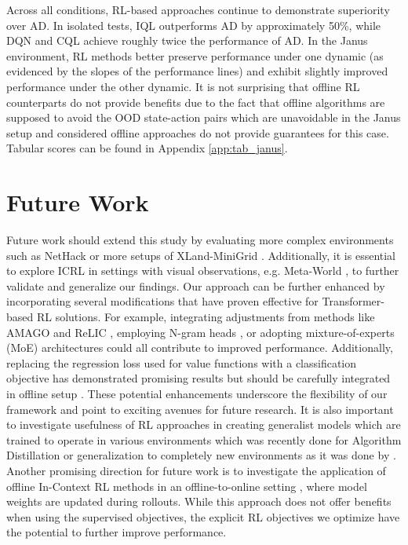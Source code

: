 \documentclass{article}
\begin{document}
Across all conditions, RL-based approaches continue to demonstrate superiority over AD. In isolated tests, IQL outperforms AD by approximately 50\%, while DQN and CQL achieve roughly twice the performance of AD. In the Janus environment, RL methods better preserve performance under one dynamic (as evidenced by the slopes of the performance lines) and exhibit slightly improved performance under the other dynamic. It is not surprising that offline RL counterparts do not provide benefits due to the fact that offline algorithms are supposed to avoid the OOD state-action pairs which are unavoidable in the Janus setup and considered offline approaches do not provide guarantees for this case. Tabular scores can be found in Appendix \ref{app:tab_janus}.
\section{Future Work}
\label{app:future}
Future work should extend this study by evaluating more complex environments such as NetHack \citep{kuttler2020nethack, kurenkov2024katakomba} or more setups of XLand-MiniGrid \citep{nikulin2023xland, nikulin2024xland}. Additionally, it is essential to explore ICRL in settings with visual observations, e.g. Meta-World \citep{yu2020meta}, to further validate and generalize our findings.
Our approach can be further enhanced by incorporating several modifications that have proven effective for Transformer-based RL solutions. For example, integrating adjustments from methods like AMAGO and ReLIC \citep{grigsby2023amago, elawady2024relic}, employing N-gram heads \citep{akyurek2024context, zisman2024n}, or adopting mixture-of-experts (MoE) architectures \citep{shazeer2017outrageously, obando2024mixtures} could all contribute to improved performance. Additionally, replacing the regression loss used for value functions with a classification objective has demonstrated promising results \citep{farebrother2024stop} but should be carefully integrated in offline setup \citep{tarasov2024value}. These potential enhancements underscore the flexibility of our framework and point to exciting avenues for future research.
It is also important to investigate usefulness of RL approaches in creating generalist models which are trained to operate in various environments which was recently done for Algorithm Distillation \citep{polubarov2025vintixactionmodelincontext} or generalization to completely new environments as it was done by \citet{raparthy2023generalization}.
Another promising direction for future work is to investigate the application of offline In-Context RL methods in an offline-to-online setting \citep{nair2020awac, lee2022offline}, where model weights are updated during rollouts. While this approach does not offer benefits when using the supervised objectives, the explicit RL objectives we optimize have the potential to further improve performance.
\end{document}
